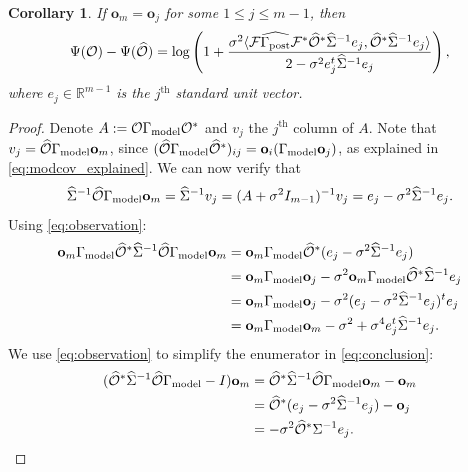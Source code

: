 \documentclass[ba]{imsart}
\newcommand{\obs}{\mathcal{O}}
\newcommand{\fwd}{\mathcal{F}}
\newcommand{\obsm}{\widehat{\obs}}
\newcommand{\Sigmam}{\widehat{\Sigma}}
\newcommand{\postcovm}{\widehat{\Gamma_{\textup{post}}}}
\newcommand{\tar}{\Psi}
\newcommand{\meas}{\mathbf{o}}
\theoremstyle{plain}
\newtheorem{corollary}[theorem]{Corollary}
\theoremstyle{definition}
\theoremstyle{remark}
\begin{document}
\begin{corollary}\label{cor:same_meas}
  If $\meas_m = \meas_j$ for some $1 \leq j \leq m-1$, then
  \begin{equation*}
    \tar(\obs) - \tar(\obsm) =
    \log \left ( 1 + \frac{\sigma^2
      \langle \fwd \postcovm \fwd^* \obsm^* \Sigmam^{-1} e_j,
      \obsm^* \Sigmam^{-1}e_j \rangle
    }{
      2 - \sigma^2 e_j^t\Sigmam^{-1}e_j 
    }       
    \right ),
  \end{equation*}
  where $e_j\in \mathbb{R}^{m-1}$ is the $j^{\text{th}}$ standard unit
  vector.
\end{corollary}

\begin{proof} \label{cor:same_meas_proof}
  Denote $A:= \obs \modcov \obs^*$ and $v_j$ the $j^{\text{th}}$
  column of $A$.  Note that $v_j = \obsm \modcov \meas_m$, since
  $(\obsm \modcov \obsm^*)_{ij} = \meas_i(\modcov \meas_j)$, as
  explained in \eqref{eq:modcov_explained}. We can now verify that
  \begin{equation}\label{eq:observation}
    \Sigmam^{-1} \obsm \modcov \meas_m = \Sigmam^{-1}v_j = (A +\sigma^2I_{m-1})^{-1} v_j =
    e_j -\sigma^2 \Sigmam^{-1}e_j.
  \end{equation}
Using \eqref{eq:observation}:
  \begin{align}\label{eq:denominator}
    \begin{split}
      \meas_m \modcov \obsm^* \Sigmam^{-1} \obsm \modcov \meas_m
      &= \meas_m \modcov \obsm^* ( e_j - \sigma^2 \Sigmam^{-1} e_j )\\
&= \meas_m \modcov \meas_j - \sigma^2 \meas_m \modcov \obsm^* \Sigmam^{-1}e_j \\
&= \meas_m \modcov \meas_j -\sigma^2 (e_j - \sigma^2 \Sigmam^{-1}e_j)^t e_j \\
&= \meas_m \modcov \meas_m -\sigma^2 + \sigma^4 e_j^t\Sigmam^{-1}e_j.
    \end{split}
  \end{align}
  We use \eqref{eq:observation} to simplify the enumerator in
  \eqref{eq:conclusion}:
  \begin{align}\label{eq:enumerator}
    \begin{split}
      (\obsm^* \Sigmam^{-1} \obsm \modcov - I ) \meas_m
      &= \obsm^* \Sigmam^{-1} \obsm \modcov \meas_m - \meas_m \\
&= \obsm^* (e_j - \sigma^2 \Sigmam^{-1} e_j) -\meas_j \\ 
&= -\sigma^2 \obsm^* \Sigma^{-1}e_j. 
    \end{split}

\end{align}
\end{proof}
\end{document}
